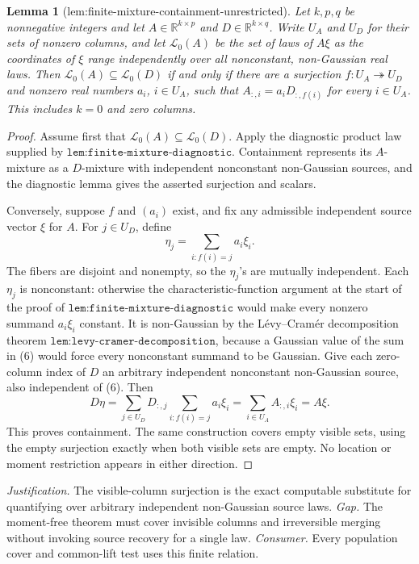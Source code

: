 \documentclass{article}
\newtheorem{lemma}{Lemma}
\begin{document}
\begin{lemma}[lem:finite-mixture-containment-unrestricted]\label{lem:finite-mixture-containment-unrestricted}
Let \(k,p,q\) be nonnegative integers and let \(A\in\mathbb R^{k\times p}\) and \(D\in\mathbb R^{k\times q}\). Write \(U_A\) and \(U_D\) for their sets of nonzero columns, and let \(\mathscr L_0(A)\) be the set of laws of \(A\xi\) as the coordinates of \(\xi\) range independently over all nonconstant, non-Gaussian real laws. Then \(\mathscr L_0(A)\subseteq\mathscr L_0(D)\) if and only if there are a surjection \(f:U_A\twoheadrightarrow U_D\) and nonzero real numbers \(a_i\), \(i\in U_A\), such that \(A_{:,i}=a_iD_{:,f(i)}\) for every \(i\in U_A\). This includes \(k=0\) and zero columns.
\end{lemma}
\begin{proof}
Assume first that \(\mathscr L_0(A)\subseteq\mathscr L_0(D)\). Apply the diagnostic product law supplied by \(\texttt{lem:finite-mixture-diagnostic}\). Containment represents its \(A\)-mixture as a \(D\)-mixture with independent nonconstant non-Gaussian sources, and the diagnostic lemma gives the asserted surjection and scalars.

Conversely, suppose \(f\) and \((a_i)\) exist, and fix any admissible independent source vector \(\xi\) for \(A\). For \(j\in U_D\), define
\[
\eta_j=\sum_{i:f(i)=j}a_i\xi_i. \tag{6}
\]
The fibers are disjoint and nonempty, so the \(\eta_j\)'s are mutually independent. Each \(\eta_j\) is nonconstant: otherwise the characteristic-function argument at the start of the proof of \(\texttt{lem:finite-mixture-diagnostic}\) would make every nonzero summand \(a_i\xi_i\) constant. It is non-Gaussian by the L\'evy--Cram\'er decomposition theorem \(\texttt{lem:levy-cramer-decomposition}\), because a Gaussian value of the sum in (6) would force every nonconstant summand to be Gaussian. Give each zero-column index of \(D\) an arbitrary independent nonconstant non-Gaussian source, also independent of (6). Then
\[
D\eta=\sum_{j\in U_D}D_{:,j}\sum_{i:f(i)=j}a_i\xi_i
=\sum_{i\in U_A}A_{:,i}\xi_i=A\xi.
\]
This proves containment. The same construction covers empty visible sets, using the empty surjection exactly when both visible sets are empty. No location or moment restriction appears in either direction.
\end{proof}
\par\smallskip\noindent \textit{Justification.} The visible-column surjection is the exact computable substitute for quantifying over arbitrary independent non-Gaussian source laws. \textit{Gap.} The moment-free theorem must cover invisible columns and irreversible merging without invoking source recovery for a single law. \textit{Consumer.} Every population cover and common-lift test uses this finite relation.
\end{document}
